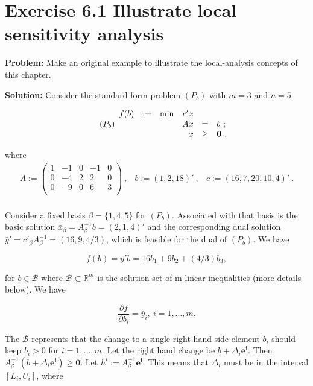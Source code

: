 \section{Exercise 6.1 Illustrate local sensitivity analysis}
\textbf{Problem:} Make an original example to illustrate the local-analysis concepts of this chapter.

\textbf{Solution:}  Consider the standard-form problem $(P_{b})$ with $m=3$ and $n=5$

\[
\tag{$P_{b}$}
\begin{array}{ccrrcl}
f(b) & := & \min & c'x  &      &   \\
   &&   &  Ax  &   =  & b~; \\
   &&   &   x  & \geq & \mathbf{0}~,
\end{array}
\]

where
\[
\begin{array}{ccc}
A  :=  \left(
  \begin{array}{ccccc}
    1 & -1 & 0 & -1 & 0  \\
    0 & -4 & 2 & 2 & 0 \\
    0 & -9 & 0 & 6 & 3\\
  \end{array}
\right)~, &
b  :=  (1,2,18)'~,&
c  :=  (16, 7, 20, 10, 4)'~.\\

\end{array}
\]

Consider a fixed basis $\beta = \{1,4,5\}$ for $(P_{b})$. Associated with that basis is the basic solution $\bar{x}_\beta=A^{-1}_\beta b = (2,1,4)'$ and the corresponding dual solution $\bar{y}'= c'_{\beta}A^{-1}_{\beta} = (16,9,4/3)$, which is feasible for the dual of $(P_{b})$. We have

$$f(b) = \bar{y}'b = 16b_1+9b_2+(4/3)b_3,$$

for $b \in \mathcal{B}$ where $\mathcal{B} \subset \mathbb{R}^m$ is the solution set of m linear inequalities (more details below). We have

$$\frac{\partial f}{\partial b_i} = \bar{y}_i,~i=1,...,m.$$

The $\mathcal{B}$ represents that the change to a single right-hand side element $b_i$ should keep $\bar{b}_i > 0$ for $i=1,...,m$. Let the right hand change be $b+\Delta_i{\boldsymbol{e^{i}}}$. Then $A^{-1}_{\beta}(b+\Delta_i{\boldsymbol{e^{i}}}) \geq \mathbf{0}$. Let $h^i := A^{-1}_{\beta}{\boldsymbol{e^{i}}}$. This means that $\Delta_i$ must be in the interval $[L_i, U_i]$, where

